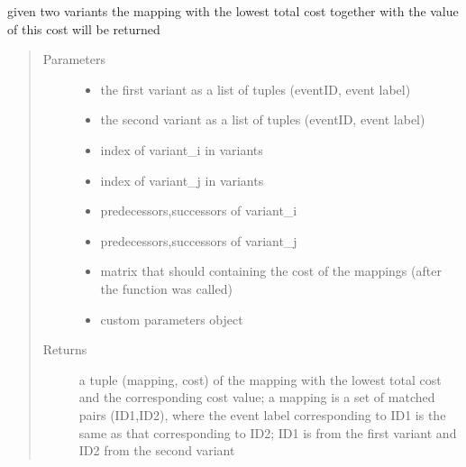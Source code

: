 \documentclass[letterpaper,10pt,english]{sphinxmanual}
\begin{document}
\begin{fulllineitems}
\label{\detokenize{cost function:costFunction.cost.optimalMapping}}
given two variants the mapping with the lowest total cost together with the value of this cost will be returned
\begin{quote}\begin{description}
\item[{Parameters}] \leavevmode\begin{itemize}
\item {} 
 \textendash{} the first variant as a list of tuples (eventID, event label)

\item {} 
 \textendash{} the second variant as a list of tuples (eventID, event label)

\item {} 
 \textendash{} index of variant\_i in variants

\item {} 
 \textendash{} index of variant\_j in variants

\item {} 
 \textendash{} predecessors,successors of variant\_i

\item {} 
 \textendash{} predecessors,successors of variant\_j

\item {} 
 \textendash{} matrix that should containing the cost of the mappings (after the function was called)

\item {} 
 \textendash{} custom parameters object

\end{itemize}

\item[{Returns}] \leavevmode
a tuple (mapping, cost) of the mapping with the lowest total cost and the corresponding cost value; a mapping is a set of matched pairs (ID1,ID2), where the event label corresponding to ID1 is the same as that corresponding to ID2; ID1 is from the first variant and ID2 from the second variant

\end{description}\end{quote}

\end{fulllineitems}
\end{document}
